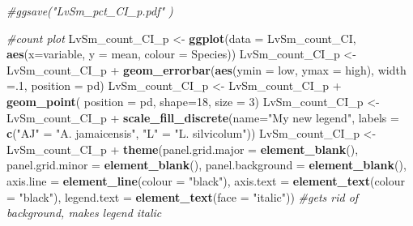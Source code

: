 \documentclass[]{article}
\newenvironment{Shaded}{\begin{snugshade}}{\end{snugshade}}
\newcommand{\KeywordTok}[1]{\textcolor[rgb]{0.13,0.29,0.53}{\textbf{{#1}}}}
\newcommand{\DataTypeTok}[1]{\textcolor[rgb]{0.13,0.29,0.53}{{#1}}}
\newcommand{\DecValTok}[1]{\textcolor[rgb]{0.00,0.00,0.81}{{#1}}}
\newcommand{\StringTok}[1]{\textcolor[rgb]{0.31,0.60,0.02}{{#1}}}
\newcommand{\CommentTok}[1]{\textcolor[rgb]{0.56,0.35,0.01}{\textit{{#1}}}}
\newcommand{\NormalTok}[1]{{#1}}
\begin{document}
\begin{Shaded}
\begin{Highlighting}[]
\CommentTok{#ggsave("LvSm_pct_CI_p.pdf"  )}

\CommentTok{#count plot}
\NormalTok{LvSm_count_CI_p <-}\StringTok{ }\KeywordTok{ggplot}\NormalTok{(}\DataTypeTok{data =} \NormalTok{LvSm_count_CI, }\KeywordTok{aes}\NormalTok{(}\DataTypeTok{x=}\NormalTok{variable, }\DataTypeTok{y =} \NormalTok{mean, }\DataTypeTok{colour =} \NormalTok{Species))}
\NormalTok{LvSm_count_CI_p <-}\StringTok{ }\NormalTok{LvSm_count_CI_p +}\StringTok{ }\KeywordTok{geom_errorbar}\NormalTok{(}\KeywordTok{aes}\NormalTok{(}\DataTypeTok{ymin =} \NormalTok{low, }\DataTypeTok{ymax =} \NormalTok{high), }\DataTypeTok{width =}\NormalTok{.}\DecValTok{1}\NormalTok{, }\DataTypeTok{position =} \NormalTok{pd)}
\NormalTok{LvSm_count_CI_p <-}\StringTok{ }\NormalTok{LvSm_count_CI_p +}\StringTok{ }\KeywordTok{geom_point}\NormalTok{( }\DataTypeTok{position =} \NormalTok{pd, }\DataTypeTok{shape=}\DecValTok{18}\NormalTok{, }\DataTypeTok{size =} \DecValTok{3}\NormalTok{)}
\NormalTok{LvSm_count_CI_p <-}\StringTok{ }\NormalTok{LvSm_count_CI_p +}\StringTok{ }\KeywordTok{scale_fill_discrete}\NormalTok{(}\DataTypeTok{name=}\StringTok{"My new legend"}\NormalTok{, }\DataTypeTok{labels =} \KeywordTok{c}\NormalTok{(}\StringTok{"AJ"} \NormalTok{=}\StringTok{ "A. jamaicensis"}\NormalTok{, }\StringTok{"L"} \NormalTok{=}\StringTok{ "L. silvicolum"}\NormalTok{)) }
\NormalTok{LvSm_count_CI_p <-}\StringTok{ }\NormalTok{LvSm_count_CI_p +}\StringTok{ }\KeywordTok{theme}\NormalTok{(}\DataTypeTok{panel.grid.major =} \KeywordTok{element_blank}\NormalTok{(), }\DataTypeTok{panel.grid.minor =} \KeywordTok{element_blank}\NormalTok{(),}
\DataTypeTok{panel.background =} \KeywordTok{element_blank}\NormalTok{(), }\DataTypeTok{axis.line =} \KeywordTok{element_line}\NormalTok{(}\DataTypeTok{colour =} \StringTok{"black"}\NormalTok{), }\DataTypeTok{axis.text =} \KeywordTok{element_text}\NormalTok{(}\DataTypeTok{colour =} \StringTok{"black"}\NormalTok{), }\DataTypeTok{legend.text =} \KeywordTok{element_text}\NormalTok{(}\DataTypeTok{face =} \StringTok{"italic"}\NormalTok{))  }\CommentTok{#gets rid of background, makes legend italic}


\end{Highlighting}
\end{Shaded}
\end{document}
